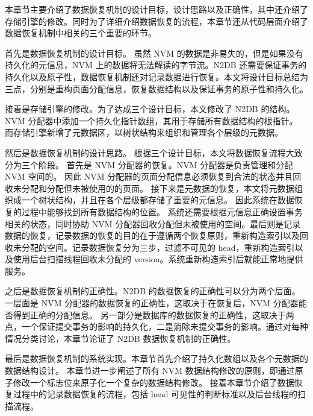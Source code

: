 本章节主要介绍了数据恢复机制的设计目标，设计思路以及正确性，其中还介绍了存储引擎的修改。同时为了详细介绍数据恢复的流程，本章节还从代码层面介绍了数据恢复机制中相关的三个重要的环节。

首先是数据恢复机制的设计目标。
虽然 NVM 的数据是非易失的，但是如果没有持久化的元信息，NVM 上的数据将无法解读的字节流。N2DB 还需要保证事务的持久化以及原子性，数据恢复机制还对记录数据进行恢复。本文将设计目标总结为三点，分别是重构页面分配信息，恢复数据结构以及保证事务的原子性和持久化。

接着是存储引擎的修改。为了达成三个设计目标，本文修改了 N2DB 的结构。NVM 分配器中添加一个持久化指针数组，其用于存储所有数据结构的根指针。
而存储引擎新增了元数据区，以树状结构来组织和管理各个层级的元数据。

然后是数据恢复机制的设计思路。
根据三个设计目标，本文将数据恢复流程大致分为三个阶段。
首先是 NVM 分配器的恢复。NVM 分配器是负责管理和分配 NVM 空间的。
因此 NVM 分配器的页面分配信息必须恢复到合法的状态并且回收未分配和分配但未被使用的的页面。
接下来是元数据的恢复，本文将元数据组织成一个树状结构，并且在各个层级都存储了重要的元信息。
因此系统在数据恢复的过程中能够找到所有数据结构的位置。
系统还需要根据元信息正确设置事务相关的状态，同时协助 NVM 分配器回收分配但未被使用的空间。最后则是记录数据的恢复，记录数据的恢复的目的在于遵循两个恢复原则，重新构造索引以及回收未分配的空间。记录数据恢复分为三步，过滤不可见的 head，重新构造索引以及使用后台扫描线程回收未分配的 version。系统重新构造索引后就能正常地提供服务。

之后是数据恢复机制的正确性。N2DB 的数据恢复的正确性可以分为两个层面。一层面是 NVM 分配器的数据恢复的正确性，这取决于在恢复后，NVM 分配器能否得到正确的分配信息。
另一部分是数据库的数据恢复的正确性，这取决于两点，一个保证提交事务的影响的持久化，二是消除未提交事务的影响。通过对每种情况分类讨论，本章节论证了 N2DB 数据恢复机制的正确性。

最后是数据恢复机制的系统实现。本章节首先介绍了持久化数组以及各个元数据的数据结构设计。
本章节进一步阐述了所有 NVM 数据结构修改的原则，即通过原子修改一个标志位来原子化一个复杂的数据结构修改。
接着本章节介绍了数据恢复过程中的记录数据恢复的流程，包括 head 可见性的判断标准以及后台线程的扫描流程。


